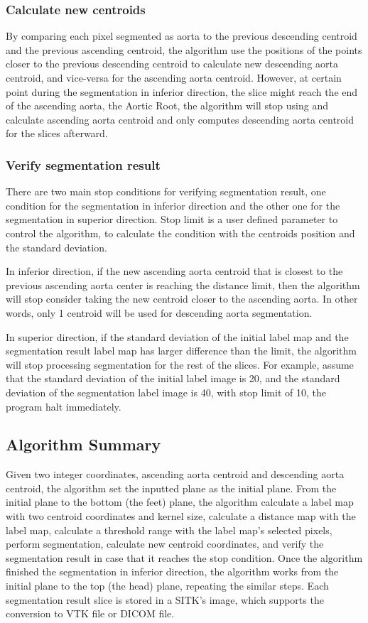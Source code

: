 \subsubsection{Calculate new centroids}
By comparing each pixel segmented as aorta to the previous descending centroid and the previous ascending centroid, the algorithm use the positions of the points closer to the previous descending centroid to calculate new descending aorta centroid, and vice-versa for the ascending aorta centroid. However, at certain point during the segmentation in inferior direction, the slice might reach the end of the ascending aorta, the Aortic Root, the algorithm will stop using and calculate ascending aorta centroid and only computes descending aorta centroid for the slices afterward.

\subsubsection{Verify segmentation result}
There are two main stop conditions for verifying segmentation result, one condition for the segmentation in inferior direction and the other one for the segmentation in superior direction. Stop limit is a user defined parameter to control the algorithm, to calculate the condition with the centroids position and the standard deviation.

In inferior direction, if the new ascending aorta centroid that is closest to the previous ascending aorta center is reaching the distance limit, then the algorithm will stop consider taking the new centroid closer to the ascending aorta. In other words, only 1 centroid will be used for descending aorta segmentation.

In superior direction, if the standard deviation of the initial label map and the segmentation result label map has larger difference than the limit, the algorithm will stop processing segmentation for the rest of the slices. For example, assume that the standard deviation of the initial label image is 20, and the standard deviation of the segmentation label image is 40, with stop limit of 10, the program halt immediately.

\subsection{Algorithm Summary}
Given two integer coordinates, ascending aorta centroid and descending aorta centroid, the algorithm set the inputted plane as the initial plane. From the initial plane to the bottom (the feet) plane, the algorithm calculate a label map with two centroid coordinates and kernel size, calculate a distance map with the label map, calculate a threshold range with the label map's selected pixels, perform segmentation, calculate new centroid coordinates, and verify the segmentation result in case that it reaches the stop condition. Once the algorithm finished the segmentation in inferior direction, the algorithm works from the initial plane to the top (the head) plane, repeating the similar steps. Each segmentation result slice is stored in a SITK's image, which supports the conversion to VTK file or DICOM file.

